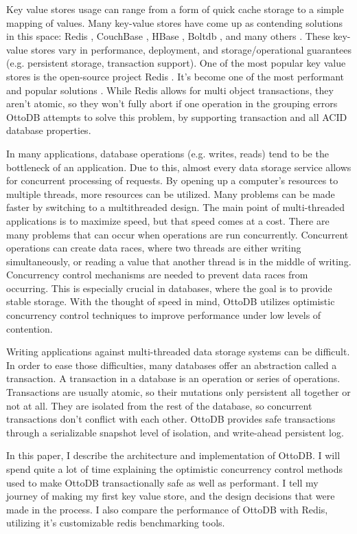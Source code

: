 \documentclass[conference]{IEEEtran}
\begin{document}
    Key value stores usage can range from a form of quick cache storage to a simple mapping of values. Many key-value stores have come up as contending solutions in this space: Redis \cite{b1}, CouchBase \cite{b3}, HBase \cite{b4}, Boltdb \cite{b5}, and many others \cite{b6, b7, b8}. These key-value stores vary in performance, deployment, and storage/operational guarantees (e.g. persistent storage, transaction support). One of the most popular key value stores is the open-source project Redis \cite{b1}. It's become one of the most performant and popular solutions \cite{b27}. While Redis allows for multi object transactions, they aren't atomic, so they won't fully abort if one operation in the grouping errors \cite{b28} OttoDB attempts to solve this problem, by supporting transaction and all ACID database properties. 
    
    In many applications, database operations (e.g. writes, reads) tend to be the bottleneck of an application. Due to this, almost every data storage service allows for concurrent processing of requests. By opening up a computer's resources to multiple threads, more resources can be utilized. Many problems can be made faster by switching to a multithreaded design. The main point of multi-threaded applications is to maximize speed, but that speed comes at a cost. There are many problems that can occur when operations are run concurrently. Concurrent operations can create data races, where two threads are either writing simultaneously, or reading a value that another thread is in the middle of writing. Concurrency control mechanisms are needed to prevent data races from occurring. This is especially crucial in databases, where the goal is to provide stable storage. With the thought of speed in mind, OttoDB utilizes optimistic concurrency control techniques to improve performance under low levels of contention. 
    
    Writing applications against multi-threaded data storage systems can be difficult. In order to ease those difficulties, many databases offer an abstraction called a transaction. A transaction in a database is an operation or series of operations. Transactions are usually atomic, so their mutations only persistent all together or not at all. They are isolated from the rest of the database, so concurrent transactions don't conflict with each other. OttoDB provides safe transactions through a serializable snapshot level of isolation, and write-ahead persistent log.
    
    In this paper, I describe the architecture and implementation of OttoDB. I will spend quite a lot of time explaining the optimistic concurrency control methods used to make OttoDB transactionally safe as well as performant. I tell my journey of making my first key value store, and the design decisions that were made in the process. I also compare the performance of OttoDB with Redis, utilizing it's customizable redis benchmarking tools.
    
\end{document}
